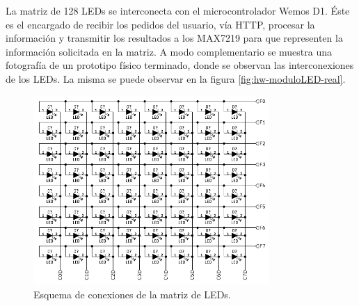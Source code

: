     La matriz de 128 LEDs se interconecta con el microcontrolador Wemos D1. Éste es el encargado de recibir los pedidos del usuario, vía HTTP, procesar la información y transmitir los resultados a los MAX7219 para que representen la información solicitada en la matriz. A modo complementario se muestra una fotografía de un prototipo físico terminado, donde se observan las interconexiones de los LEDs. La misma se puede observar en la figura \ref{fig:hw-moduloLED-real}.

    \begin{figure}[ht!]
    	\begin{center}
    		\includegraphics[width=0.8\textwidth]{imagenes/hw-conexiones/moduloLED.pdf}
    		\caption{Esquema de conexiones de la matriz de LEDs.}
    		\label{fig:hw-moduloLED}
    	\end{center}
    \end{figure}
    
